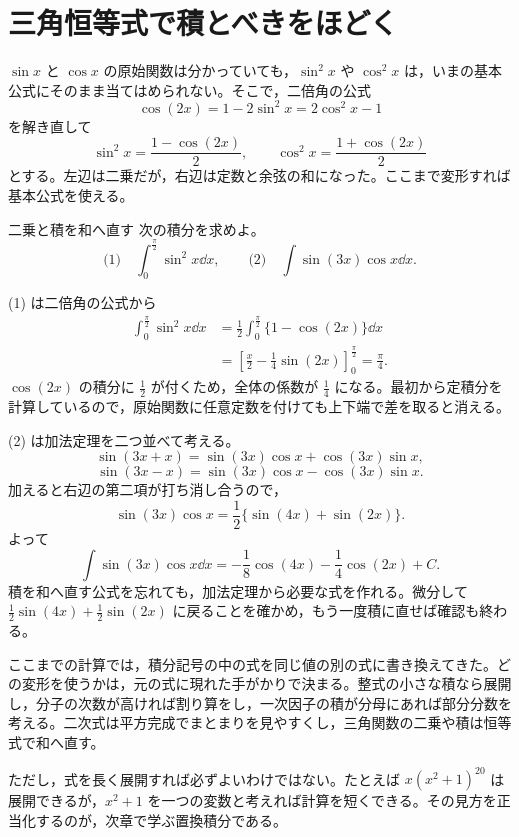 \section{三角恒等式で積とべきをほどく}\label{節:三角式の整理}

$\sin x$ と $\cos x$ の原始関数は分かっていても，$\sin^2x$ や $\cos^2x$ は，いまの基本公式にそのまま当てはめられない。そこで，二倍角の公式
\[
 \cos(2x)=1-2\sin^2x=2\cos^2x-1
\]
を解き直して
\[
 \sin^2x=\frac{1-\cos(2x)}2,\qquad
 \cos^2x=\frac{1+\cos(2x)}2
\]
とする。左辺は二乗だが，右辺は定数と余弦の和になった。ここまで変形すれば基本公式を使える。

\begin{example}{二乗と積を和へ直す}
次の積分を求めよ。
\[
 \text{(1)}\quad\int_0^{\frac\pi2}\sin^2x\dd x,
 \qquad
 \text{(2)}\quad\int\sin(3x)\cos x\dd x.
\]
\end{example}

(1) は二倍角の公式から
\[
\begin{aligned}
 \int_0^{\frac\pi2}\sin^2x\dd x
 &=\frac12\int_0^{\frac\pi2}\{1-\cos(2x)\}\dd x\\
 &=\left[\frac x2-\frac14\sin(2x)\right]_0^{\frac\pi2}
 =\frac\pi4.
\end{aligned}
\]
$\cos(2x)$ の積分に $\frac12$ が付くため，全体の係数が $\frac14$ になる。最初から定積分を計算しているので，原始関数に任意定数を付けても上下端で差を取ると消える。

(2) は加法定理を二つ並べて考える。
\[
 \sin(3x+x)=\sin(3x)\cos x+\cos(3x)\sin x,
\]
\[
 \sin(3x-x)=\sin(3x)\cos x-\cos(3x)\sin x.
\]
加えると右辺の第二項が打ち消し合うので，
\[
 \sin(3x)\cos x=\frac12\{\sin(4x)+\sin(2x)\}.
\]
よって
\[
 \int\sin(3x)\cos x\dd x
 =-\frac18\cos(4x)-\frac14\cos(2x)+C.
\]
積を和へ直す公式を忘れても，加法定理から必要な式を作れる。微分して $\frac12\sin(4x)+\frac12\sin(2x)$ に戻ることを確かめ，もう一度積に直せば確認も終わる。

ここまでの計算では，積分記号の中の式を同じ値の別の式に書き換えてきた。どの変形を使うかは，元の式に現れた手がかりで決まる。整式の小さな積なら展開し，分子の次数が高ければ割り算をし，一次因子の積が分母にあれば部分分数を考える。二次式は平方完成でまとまりを見やすくし，三角関数の二乗や積は恒等式で和へ直す。

ただし，式を長く展開すれば必ずよいわけではない。たとえば $x(x^2+1)^{20}$ は展開できるが，$x^2+1$ を一つの変数と考えれば計算を短くできる。その見方を正当化するのが，次章で学ぶ置換積分である。

